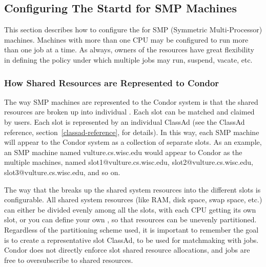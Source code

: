 \subsection{\label{sec:Configuring-SMP}
Configuring The Startd for SMP Machines}

This section describes how to configure the  for SMP
(Symmetric Multi-Processor) machines.
Machines with more than one CPU may
be configured to run more than one job at a time.
As always, owners of the resources have great flexibility in defining
the policy under which multiple jobs may run, suspend, vacate, etc.  

\subsubsection{\label{sec:How-Resources-Represented}
How Shared Resources are Represented to Condor}

The way SMP machines are represented to the Condor system is that
the shared resources are broken up into individual .
Each slot can be matched and claimed by users.
Each slot is represented by an individual ClassAd
(see the ClassAd reference, section~\ref{classad-reference}, for
details). 
In this way, each SMP machine will appear to the Condor system as
a collection of separate slots.  
As an example, an SMP machine named
vulture.cs.wisc.edu would appear to Condor as the
multiple machines, named slot1@vulture.cs.wisc.edu,
slot2@vulture.cs.wisc.edu,
slot3@vulture.cs.wisc.edu, and so on.

The way that the  breaks up the
shared system resources into the different slots
is configurable.
All shared system resources (like RAM, disk space, swap space, etc.)
can either be divided evenly among all the slots, with each
CPU getting its own slot, or you can define your own
, so that resources can be unevenly
partitioned.  Regardless of the partitioning scheme used, it is important
to remember the goal is to create a representative slot
ClassAd, to be used for matchmaking with jobs.  Condor does not
directly enforce slot shared resource allocations, and jobs
are free to oversubscribe to shared resources.

